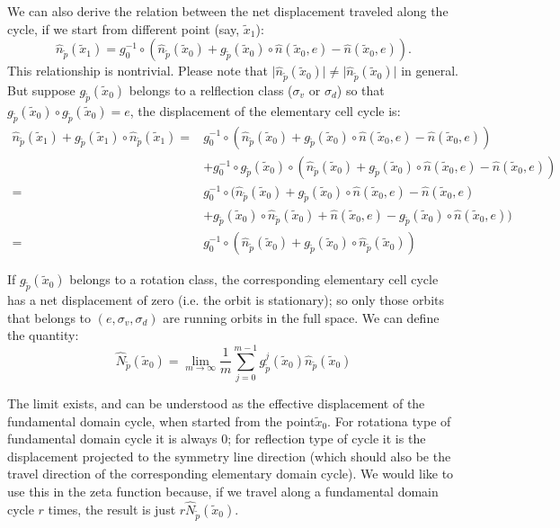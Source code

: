 \begin{description}
We can also derive the relation between the net displacement traveled
along the cycle, if we start from different point (say, $\tilde{x}_{1}$):
\[
\hat{n}_{\tilde{p}}(\tilde{x}_{1})=g_{0}^{-1}\circ\left(\hat{n}_{\tilde{p}}(\tilde{x}_{0})+g_{\tilde{p}}(\tilde{x}_{0})\circ\hat{n}(\tilde{x}_{0},e)-\hat{n}(\tilde{x}_{0},e)\right).
\]
This relationship is nontrivial. Please note that $\vert\hat{n}_{\tilde{p}}(\tilde{x}_{0})\vert\neq\vert\hat{n}_{\tilde{p}}(\tilde{x}_{0})\vert$
in general. But suppose $g_{\tilde{p}}(\tilde{x}_{0})$ belongs to
a relflection class ($\sigma_{v}$ or $\sigma_{d}$) so that $g_{\tilde{p}}(\tilde{x}_{0})\circ g_{\tilde{p}}(\tilde{x}_{0})=e$,
the displacement of the elementary cell cycle is:
\begin{align*}
\hat{n}_{\tilde{p}}(\tilde{x}_{1})+g_{\tilde{p}}(\tilde{x}_{1})\circ\hat{n}_{\tilde{p}}(\tilde{x}_{1})= & g_{0}^{-1}\circ\left(\hat{n}_{\tilde{p}}(\tilde{x}_{0})+g_{\tilde{p}}(\tilde{x}_{0})\circ\hat{n}(\tilde{x}_{0},e)-\hat{n}(\tilde{x}_{0},e)\right)\\
 & +g_{0}^{-1}\circ g_{\tilde{p}}(\tilde{x}_{0})\circ\left(\hat{n}_{\tilde{p}}(\tilde{x}_{0})+g_{\tilde{p}}(\tilde{x}_{0})\circ\hat{n}(\tilde{x}_{0},e)-\hat{n}(\tilde{x}_{0},e)\right)\\
= & g_{0}^{-1}\circ(\hat{n}_{\tilde{p}}(\tilde{x}_{0})+g_{\tilde{p}}(\tilde{x}_{0})\circ\hat{n}(\tilde{x}_{0},e)-\hat{n}(\tilde{x}_{0},e)\\
 & +g_{\tilde{p}}(\tilde{x}_{0})\circ\hat{n}_{\tilde{p}}(\tilde{x}_{0})+\hat{n}(\tilde{x}_{0},e)-g_{\tilde{p}}(\tilde{x}_{0})\circ\hat{n}(\tilde{x}_{0},e))\\
= & g_{0}^{-1}\circ\left(\hat{n}_{\tilde{p}}(\tilde{x}_{0})+g_{\tilde{p}}(\tilde{x}_{0})\circ\hat{n}_{\tilde{p}}(\tilde{x}_{0})\right)
\end{align*}


If $g_{\tilde{p}}(\tilde{x}_{0})$ belongs to a rotation class, the
corresponding elementary cell cycle has a net displacement of zero
(i.e. the orbit is stationary); so only those orbits that belongs
to $(e,\sigma_{v},\sigma_{d})$ are running orbits in the full space.
We can define the quantity:
\[
\hat{N}_{\tilde{p}}(\tilde{x}_{0})=\lim_{m\to\infty}\frac{1}{m}\sum_{j=0}^{m-1}g_{\tilde{p}}^{j}(\tilde{x}_{0})\hat{n}_{\tilde{p}}(\tilde{x}_{0})
\]


The limit exists, and can be understood as the effective displacement
of the fundamental domain cycle, when started from the point$\tilde{x}_{0}$.
For rotationa type of fundamental domain cycle it is always $0$;
for reflection type of cycle it is the displacement projected to the
symmetry line direction (which should also be the travel direction
of the corresponding elementary domain cycle). We would like to use
this in the zeta function because, if we travel along a fundamental
domain cycle $r$ times, the result is just $r\hat{N}_{\tilde{p}}(\tilde{x}_{0})$. 


\end{description}
